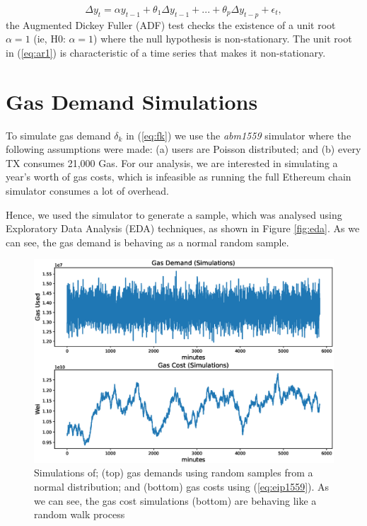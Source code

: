 \documentclass[futureinternet,article,submit,moreauthors,dvi2pdf]{mdpi}
\begin{document}
\begin{equation}
\Delta y_{t} = \alpha y_{t-1} + \theta_{1} \Delta y_{t-1}  + ... + \theta_{p} \Delta y_{t-p} + \epsilon_{t},
\label{eq:ar1} 
\end{equation}
the Augmented Dickey Fuller (ADF) test checks the existence of a unit root $\alpha = 1$ (ie, H0: $\alpha = 1$) where the null hypothesis is non-stationary. The unit root in (\ref{eq:ar1}) is characteristic of a time series that makes it non-stationary.

\section{Gas Demand Simulations}
\label{section:gas_demand}

To simulate gas demand $\delta_{k}$ in (\ref{eq:fk}) we use the \textit{abm1559}  simulator \cite{Mon21} where the following assumptions were made: (a) users are Poisson distributed; and (b) every TX consumes 21,000 Gas. For our analysis, we are interested in simulating a year's worth of gas costs, which is infeasible as running the full Ethereum chain simulator consumes a lot of overhead.

Hence, we used the simulator to generate a sample, which was analysed using Exploratory Data Analysis (EDA) techniques, as shown in Figure \ref{fig:eda}. As we can see, the gas demand is behaving as a normal random sample. 

\begin{figure}
\centering
\includegraphics[width=12 cm]{gas.eps}
\caption{Simulations of; (top) gas demands using random samples from a normal distribution; and (bottom) gas costs using (\ref{eq:eip1559}). As we can see, the gas cost simulations (bottom) are behaving like a random walk process} 
\label{fig:gas}
\end{figure} 
\end{document}
